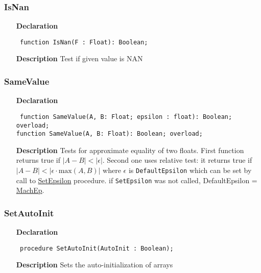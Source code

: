 \documentclass[12pt,a4paper,oneside]{report}
\newcommand{\lmath}[1]{   %
	\marginpar{\vspace{#1} 
		\begin{flushright}
			LMath
	\end{flushright} }
}
\newcommand{\declarationitem}[1]{\textbf{#1}}
\newcommand{\descriptiontitle}[1]{\textbf{#1}}
\newcommand{\code}[1]{\texttt{#1}}
\begin{document}
\subsubsection{IsNan}
\lmath{-24pt}
\label{utypes-IsNan}
\begin{itemize}\item[\declarationitem{Declaration}\hfill]
	\begin{flushleft}
		\code{
			function IsNan(F : Float): Boolean;}
	\end{flushleft}
	\item[\descriptiontitle{Description}]
	Test if given value is NAN
	
\end{itemize}
\subsubsection{SameValue}
\lmath{-24pt}
\label{utypes-SameValue}
\begin{itemize}\item[\declarationitem{Declaration}\hfill]
	\begin{flushleft}
		\code{
			function SameValue(A, B: Float; epsilon : float): Boolean; overload;\\
			function SameValue(A, B: Float): Boolean; overload;}
	\end{flushleft}
	\item[\descriptiontitle{Description}]
	Tests for approximate equality of two floats. First function returns true if $\left| A-B \right| < \left| \epsilon \right| $. Second one uses relative test: it returns true if $\left| A-B \right| < \left| \epsilon \cdot \mathrm{max}(A,B) \right| $ where $\epsilon$ is \code{DefaultEpsilon} which can be set by call to \hyperref[utypes-SetZeroEpsilon]{\mbox{SetEpsilon}} procedure. if \code{SetEpsilon} was not called, DefaultEpsilon = \hyperref[utypes-MachEp]{MachEp}.
\end{itemize}
\subsubsection{SetAutoInit}
\label{utypes-SetAutoInit}
\begin{itemize}\item[\declarationitem{Declaration}\hfill]
	\begin{flushleft}
		\code{
			procedure SetAutoInit(AutoInit : Boolean);}
		
	\end{flushleft}
	
	\par
	\item[\descriptiontitle{Description}]
	Sets the auto{-}initialization of arrays
	
\end{itemize}
\end{document}
